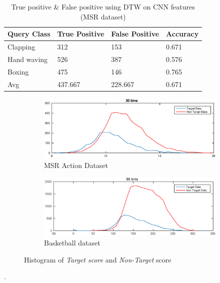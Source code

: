 \begin{table}[ht]
\caption[Event classification using DTW on CNN features (MSR Action dataset \RN{2}) ]{True positive \& False positive using DTW on CNN features (MSR dataset)}
\label{table:cnn_dtw_res_msr}
\centering
\begin{tabular}{|l|l|l|l|}
\hline
Query Class & True Positive & False Positive & Accuracy \\ \hline
Clapping    &312	&153	&0.671\\
Hand waving &526	&387	&0.576\\
Boxing      &475	&146	&0.765\\
\hline
Avg	&437.667	&228.667	&0.671\\
\hline  
\end{tabular}
\end{table} 
\pagebreak
\begin{figure}[ht]
        \centering
        \begin{subfigure}[b]{0.9\textwidth}
        		\centering
        		\includegraphics[width=\textwidth]{./imgs/MSR_DTW.eps}
        		\caption{MSR Action Dataset}
        \end{subfigure}
        
        \begin{subfigure}[b]{0.9\textwidth}
        			\centering
                \includegraphics[width=\textwidth]{./imgs/Basket_DTW.eps}
                \caption{Basketball dataset}
        \end{subfigure}
        \caption{Histogram of \textit{Target score} and \textit{Non-Target} score}
        \label{fig:dtw_score}
\end{figure}.

